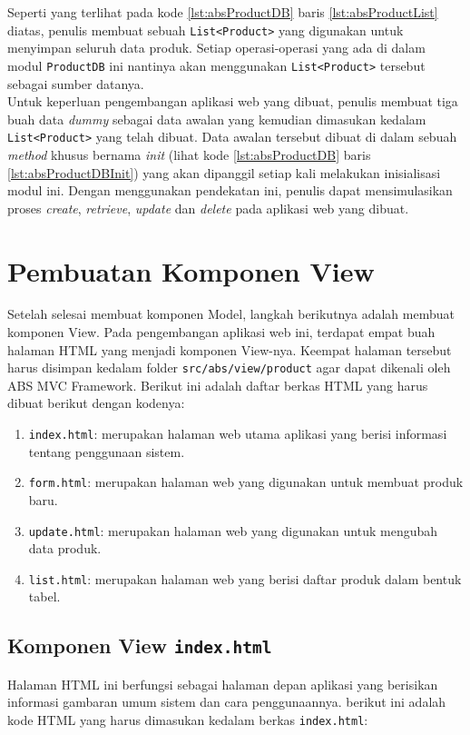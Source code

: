 Seperti yang terlihat pada kode \ref{lst:absProductDB} baris \ref{lst:absProductList} diatas, penulis membuat sebuah \texttt{List<Product>} yang digunakan untuk menyimpan seluruh data produk. Setiap operasi-operasi yang ada di dalam modul \texttt{ProductDB} ini nantinya akan menggunakan \texttt{List<Product>} tersebut sebagai sumber datanya.\\

Untuk keperluan pengembangan aplikasi web yang dibuat, penulis membuat tiga buah data \textit{dummy} sebagai data awalan yang kemudian dimasukan kedalam \texttt{List<Product>} yang telah dibuat. Data awalan tersebut dibuat di dalam sebuah \textit{method} khusus bernama \textit{init} (lihat kode \ref{lst:absProductDB} baris \ref{lst:absProductDBInit}) yang akan dipanggil setiap kali melakukan inisialisasi modul ini. Dengan menggunakan pendekatan ini, penulis dapat mensimulasikan proses \textit{create}, \textit{retrieve}, \textit{update} dan \textit{delete} pada aplikasi web yang dibuat.

\section{Pembuatan Komponen View}

Setelah selesai membuat komponen Model, langkah berikutnya adalah membuat komponen View. Pada pengembangan aplikasi web ini, terdapat empat buah halaman HTML yang menjadi komponen View-nya. Keempat halaman tersebut harus disimpan kedalam folder \texttt{src/abs/view/product} agar dapat dikenali oleh ABS MVC Framework. Berikut ini adalah daftar berkas HTML yang harus dibuat berikut dengan kodenya:

\begin{enumerate}
    \item \texttt{index.html}: merupakan halaman web utama aplikasi yang berisi informasi tentang penggunaan sistem.
    \item \texttt{form.html}: merupakan halaman web yang digunakan untuk membuat produk baru.
    \item \texttt{update.html}: merupakan halaman web yang digunakan untuk mengubah data produk.
    \item \texttt{list.html}: merupakan halaman web yang berisi daftar produk dalam bentuk tabel.
\end{enumerate}

\subsection{Komponen View \texttt{index.html}}
Halaman HTML ini berfungsi sebagai halaman depan aplikasi yang berisikan informasi gambaran umum sistem dan cara penggunaannya. berikut ini adalah kode HTML yang harus dimasukan kedalam berkas \texttt{index.html}:

